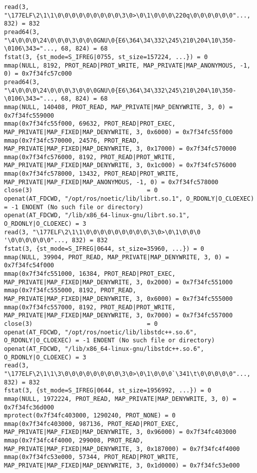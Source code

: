 \documentclass[a4paper, 12pt]{article}
\begin{document}
\begin{lstlisting}
read(3, "\177ELF\2\1\1\0\0\0\0\0\0\0\0\0\3\0>\0\1\0\0\0\220q\0\0\0\0\0\0"..., 832) = 832
pread64(3, "\4\0\0\0\24\0\0\0\3\0\0\0GNU\0{E6\364\34\332\245\210\204\10\350-\0106\343="..., 68, 824) = 68
fstat(3, {st_mode=S_IFREG|0755, st_size=157224, ...}) = 0
mmap(NULL, 8192, PROT_READ|PROT_WRITE, MAP_PRIVATE|MAP_ANONYMOUS, -1, 0) = 0x7f34fc57c000
pread64(3, "\4\0\0\0\24\0\0\0\3\0\0\0GNU\0{E6\364\34\332\245\210\204\10\350-\0106\343="..., 68, 824) = 68
mmap(NULL, 140408, PROT_READ, MAP_PRIVATE|MAP_DENYWRITE, 3, 0) = 0x7f34fc559000
mmap(0x7f34fc55f000, 69632, PROT_READ|PROT_EXEC, MAP_PRIVATE|MAP_FIXED|MAP_DENYWRITE, 3, 0x6000) = 0x7f34fc55f000
mmap(0x7f34fc570000, 24576, PROT_READ, MAP_PRIVATE|MAP_FIXED|MAP_DENYWRITE, 3, 0x17000) = 0x7f34fc570000
mmap(0x7f34fc576000, 8192, PROT_READ|PROT_WRITE, MAP_PRIVATE|MAP_FIXED|MAP_DENYWRITE, 3, 0x1c000) = 0x7f34fc576000
mmap(0x7f34fc578000, 13432, PROT_READ|PROT_WRITE, MAP_PRIVATE|MAP_FIXED|MAP_ANONYMOUS, -1, 0) = 0x7f34fc578000
close(3)                                = 0
openat(AT_FDCWD, "/opt/ros/noetic/lib/librt.so.1", O_RDONLY|O_CLOEXEC) = -1 ENOENT (No such file or directory)
openat(AT_FDCWD, "/lib/x86_64-linux-gnu/librt.so.1", O_RDONLY|O_CLOEXEC) = 3
read(3, "\177ELF\2\1\1\0\0\0\0\0\0\0\0\0\3\0>\0\1\0\0\0 '\0\0\0\0\0\0"..., 832) = 832
fstat(3, {st_mode=S_IFREG|0644, st_size=35960, ...}) = 0
mmap(NULL, 39904, PROT_READ, MAP_PRIVATE|MAP_DENYWRITE, 3, 0) = 0x7f34fc54f000
mmap(0x7f34fc551000, 16384, PROT_READ|PROT_EXEC, MAP_PRIVATE|MAP_FIXED|MAP_DENYWRITE, 3, 0x2000) = 0x7f34fc551000
mmap(0x7f34fc555000, 8192, PROT_READ, MAP_PRIVATE|MAP_FIXED|MAP_DENYWRITE, 3, 0x6000) = 0x7f34fc555000
mmap(0x7f34fc557000, 8192, PROT_READ|PROT_WRITE, MAP_PRIVATE|MAP_FIXED|MAP_DENYWRITE, 3, 0x7000) = 0x7f34fc557000
close(3)                                = 0
openat(AT_FDCWD, "/opt/ros/noetic/lib/libstdc++.so.6", O_RDONLY|O_CLOEXEC) = -1 ENOENT (No such file or directory)
openat(AT_FDCWD, "/lib/x86_64-linux-gnu/libstdc++.so.6", O_RDONLY|O_CLOEXEC) = 3
read(3, "\177ELF\2\1\1\3\0\0\0\0\0\0\0\0\3\0>\0\1\0\0\0`\341\t\0\0\0\0\0"..., 832) = 832
fstat(3, {st_mode=S_IFREG|0644, st_size=1956992, ...}) = 0
mmap(NULL, 1972224, PROT_READ, MAP_PRIVATE|MAP_DENYWRITE, 3, 0) = 0x7f34fc36d000
mprotect(0x7f34fc403000, 1290240, PROT_NONE) = 0
mmap(0x7f34fc403000, 987136, PROT_READ|PROT_EXEC, MAP_PRIVATE|MAP_FIXED|MAP_DENYWRITE, 3, 0x96000) = 0x7f34fc403000
mmap(0x7f34fc4f4000, 299008, PROT_READ, MAP_PRIVATE|MAP_FIXED|MAP_DENYWRITE, 3, 0x187000) = 0x7f34fc4f4000
mmap(0x7f34fc53e000, 57344, PROT_READ|PROT_WRITE, MAP_PRIVATE|MAP_FIXED|MAP_DENYWRITE, 3, 0x1d0000) = 0x7f34fc53e000

\end{lstlisting}
\end{document}
